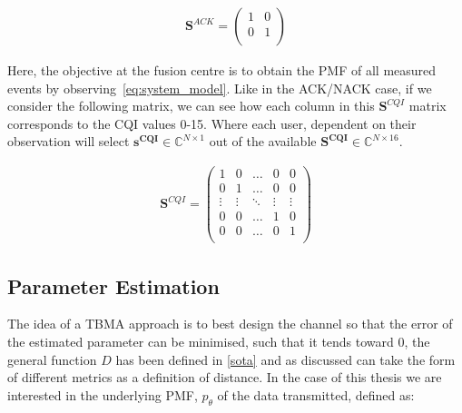 \documentclass{article}
\begin{document}
\begin{align}
    \textbf{S}^{ACK} = 
    \begin{pmatrix}
    1 & 0\\
    0 & 1 \\
    \end{pmatrix}
    \label{fig:sig_mat_ack}
\end{align}


Here, the objective at the fusion centre is to obtain the PMF of all measured events by observing~\ref{eq:system_model}. Like in the ACK/NACK case, if we consider the following matrix, we can see how each column in this $\textbf{S}^{CQI}$ matrix corresponds to the CQI values 0-15.  Where each user, dependent on their observation will select $\boldsymbol{s^{CQI}} \in \mathbb{C}^{N \times 1}$ out of the available  $\boldsymbol{S^{CQI}} \in \mathbb{C}^{N \times 16}$. 


\begin{align}
    \textbf{S}^{CQI} = 
    \begin{pmatrix}
     1 & 0 & \hdots & 0 & 0\\
    0 & 1 & \hdots & 0 & 0 \\
    \vdots & \vdots & \ddots & \vdots & \vdots \\
    0 & 0 & \hdots & 1 & 0 \\
    0 & 0 & \hdots & 0 & 1 \\
    \end{pmatrix}
    \label{fig:sig_mat_cqi}
\end{align}


\subsection{Parameter Estimation}\label{param_estimation}

The idea of a TBMA  approach is to best design the channel so that the error of the estimated parameter can be minimised, such that it tends toward 0, the general function $D$ has been defined in \cref{sota} and as discussed can take the form of different metrics as a definition of distance. In the case of this thesis we are interested in the underlying PMF, $p_{\theta}$ of the data transmitted, defined as:
\end{document}

